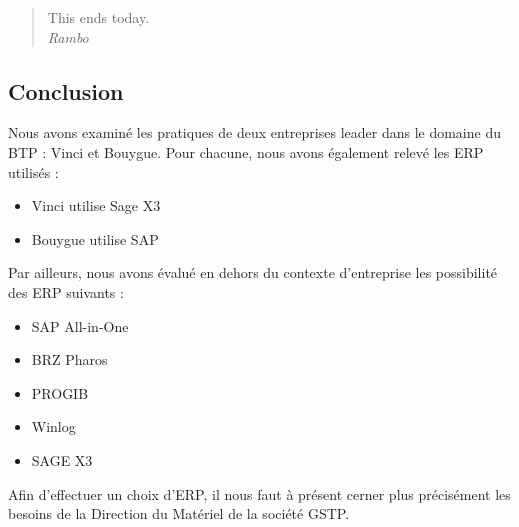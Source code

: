 \documentclass[a4paper]{article}
\begin{document}
\maketitle

\begin{quote}
This ends today.\\
\em Rambo
\end{quote}

\subsection{Conclusion}

Nous avons examiné les pratiques de deux entreprises leader dans le domaine
du BTP : Vinci et Bouygue. Pour chacune, nous avons également relevé les
ERP utilisés :

\begin{itemize}
\item Vinci utilise Sage X3
\item Bouygue utilise SAP
\end{itemize}

\vskip 6pt

Par ailleurs, nous avons évalué en dehors du contexte d'entreprise les possibilité des ERP suivants :

\begin{itemize}
\item SAP All-in-One
\item BRZ Pharos
\item PROGIB
\item Winlog
\item SAGE X3
\end{itemize}

\vskip 6pt

Afin d'effectuer un choix d'ERP, il nous faut à présent cerner plus
précisément les besoins de la Direction du Matériel de la société GSTP.
\end{document}
